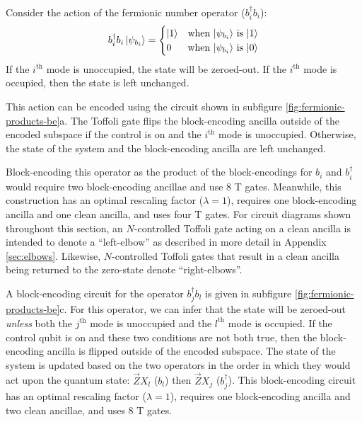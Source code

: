 Consider the action of the fermionic number operator ($b_i^\dagger b_i$):
\begin{equation}
    \begin{split}
        b_i^\dagger b_i \ket{\psi_{b_i}} = \begin{cases} 
            \ket{1} & \text{when $\ket{\psi_{b_i}}$ is $\ket{1}$} \\
            0 & \text{when $\ket{\psi_{b_i}}$ is $\ket{0}$} \\
                                        \end{cases}
    \end{split}
\end{equation}
If the $i^\text{th}$ mode is unoccupied, the state will be zeroed-out.
If the $i^\text{th}$ mode is occupied, then the state is left unchanged.

This action can be encoded using the circuit shown in subfigure \ref{fig:fermionic-products-be}a.
The Toffoli gate flips the block-encoding ancilla outside of the encoded subspace if the control is on and the $i^\text{th}$ mode is unoccupied.
Otherwise, the state of the system and the block-encoding ancilla are left unchanged.

Block-encoding this operator as the product of the block-encodings for $b_i$ and $b_i^\dagger$ would require two block-encoding ancillae and use $8$ T gates.
Meanwhile, this construction has an optimal rescaling factor ($\lambda = 1$), requires one block-encoding ancilla and one clean ancilla, and uses four T gates.
For circuit diagrams shown throughout this section, an $N$-controlled Toffoli gate acting on a clean ancilla is intended to denote a ``left-elbow'' as described in more detail in Appendix \ref{sec:elbows}.
Likewise, $N$-controlled Toffoli gates that result in a clean ancilla being returned to the zero-state denote ``right-elbows''.

A block-encoding circuit for the operator $b_j^\dagger b_l$ is given in subfigure \ref{fig:fermionic-products-be}c.
For this operator, we can infer that the state will be zeroed-out \textit{unless} both the $j^\text{th}$ mode is unoccupied and the $l^\text{th}$ mode is occupied.
If the control qubit is on and these two conditions are not both true, then the block-encoding ancilla is flipped outside of the encoded subspace.
The state of the system is updated based on the two operators in the order in which they would act upon the quantum state: $\vec{Z}X_l$ ($b_l$) then $\vec{Z}X_j$ ($b_j^\dagger$).
This block-encoding circuit has an optimal rescaling factor ($\lambda = 1$), requires one block-encoding ancilla and two clean ancillae, and uses $8$ T gates.


